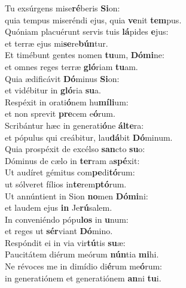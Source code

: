 \evenverse Tu exsúrgens mise\textbf{ré}beris \textbf{Si}on:~\*\\
\evenverse quia tempus miseréndi ejus, quia \textbf{ve}nit \textbf{tem}pus.\\
\oddverse Quóniam placuérunt servis tuis \textbf{lá}pides \textbf{e}jus:~\*\\
\oddverse et terræ ejus mi\textbf{se}re\textbf{bún}tur.\\
\evenverse Et timébunt gentes nomen \textbf{tu}um, \textbf{Dó}\textbf{mi}ne:~\*\\
\evenverse et omnes reges terræ \textbf{gló}riam \textbf{tu}am.\\
\oddverse Quia ædificávit \textbf{Dó}minus \textbf{Si}on:~\*\\
\oddverse et vidébitur in \textbf{gló}ria \textbf{su}a.\\
\evenverse Respéxit in orati\textbf{ó}nem hu\textbf{mí}\textbf{li}um:~\*\\
\evenverse et non sprevit \textbf{pre}cem e\textbf{ó}rum.\\
\oddverse Scribántur hæc in generati\textbf{ó}ne \textbf{ál}\textbf{te}ra:~\*\\
\oddverse et pópulus qui creábitur, lau\textbf{dá}bit \textbf{Dó}minum.\\
\evenverse Quia prospéxit de excélso \textbf{san}cto \textbf{su}o:~\*\\
\evenverse Dóminus de cælo in \textbf{ter}ram a\textbf{spé}xit:\\
\oddverse Ut audíret gémitus com\textbf{pe}di\textbf{tó}rum:~\*\\
\oddverse ut sólveret fílios in\textbf{te}rem\textbf{ptó}rum.\\
\evenverse Ut annúntient in Sion \textbf{no}men \textbf{Dó}\textbf{mi}ni:~\*\\
\evenverse et laudem ejus \textbf{in} Je\textbf{rú}salem.\\
\oddverse In conveniéndo pópu\textbf{los} in \textbf{u}num:~\*\\
\oddverse et reges ut \textbf{sér}viant \textbf{Dó}mino.\\
\evenverse Respóndit ei in via vir\textbf{tú}tis \textbf{su}æ:~\*\\
\evenverse Paucitátem diérum meórum \textbf{nún}tia \textbf{mi}hi.\\
\oddverse Ne révoces me in dimídio di\textbf{é}rum me\textbf{ó}rum:~\*\\
\oddverse in generatiónem et generatiónem \textbf{an}ni \textbf{tu}i.\\
